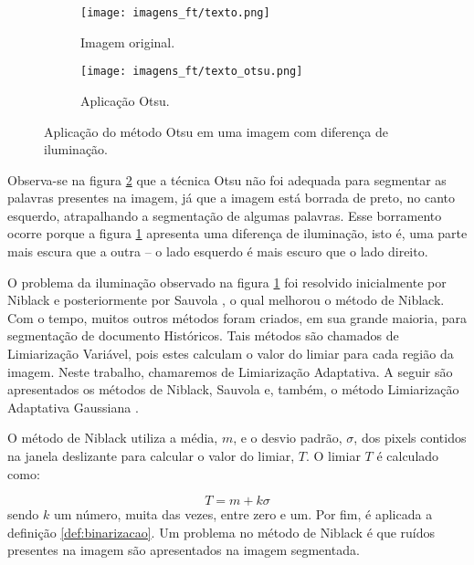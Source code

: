 \begin{figure}[h]
	\centering
	\begin{subfigure}[b]{0.45\textwidth}
		\centering
		\texttt{[image: imagens\_ft/texto.png]}
		\caption{Imagem original.}
		\label{fig:texto_original}
	\end{subfigure}
	\hfill
	\begin{subfigure}[b]{0.45\textwidth}
		\centering
		\texttt{[image: imagens\_ft/texto\_otsu.png]}
		\caption{Aplicação Otsu.}
		\label{fig:texto_otsu}
	\end{subfigure}
	\caption{Aplicação do método Otsu em uma imagem com diferença de iluminação.}
	\label{fig:texto}
\end{figure}

Observa-se na figura \ref{fig:texto_otsu} que a técnica Otsu não foi adequada para segmentar as palavras presentes na imagem, já que a imagem está borrada de preto, no canto esquerdo, atrapalhando a segmentação de algumas palavras. Esse borramento ocorre porque a figura \ref{fig:texto_original} apresenta uma diferença de iluminação, isto é, uma parte mais escura que a outra -- o lado esquerdo é mais escuro que o lado direito. 

O problema da iluminação observado na figura \ref{fig:texto_original} foi resolvido inicialmente por Niblack \cite{niblack1985introduction} e posteriormente por Sauvola \cite{sauvola2000adaptive}, o qual melhorou o método de Niblack. Com o tempo, muitos outros métodos foram criados, em sua grande maioria, para segmentação de documento Históricos. Tais métodos são chamados de Limiarização Variável, pois estes calculam o valor do limiar para cada região da imagem. Neste trabalho, chamaremos de Limiarização Adaptativa. A seguir são apresentados os métodos de Niblack, Sauvola e, também, o método Limiarização Adaptativa Gaussiana \cite{gonzalezprocessamento}. 


O método de Niblack utiliza a média, $m$, e o desvio padrão, $\sigma$, dos pixels contidos na janela deslizante para calcular o valor do limiar, $T$. O limiar $T$ é calculado como:

\begin{equation}
	T = m + k\sigma
\end{equation}
sendo $k$ um número, muita das vezes, entre zero e um. Por fim, é aplicada a definição \ref{def:binarizacao}. Um problema no método de Niblack é que ruídos presentes na imagem são apresentados na imagem segmentada.

